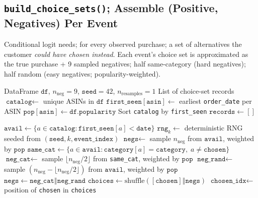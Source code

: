 \documentclass[11pt,a4paper]{article}
\begin{document}
\subsection{\texttt{build\_choice\_sets()}; Assemble (Positive, Negatives) Per Event}
\label{sec:build-choice-sets}

Conditional logit needs; for every observed purchase; a set of alternatives the customer \emph{could have chosen instead}.  Each event's choice set is approximated as the true purchase + 9 sampled negatives; half same-category (hard negatives); half random (easy negatives; popularity-weighted).

\begin{algorithm}[H]
\caption{\textsc{BuildChoiceSets}}\label{alg:build-choice-sets}
\begin{algorithmic}[1]
\Require DataFrame $\texttt{df}$, $n_{\text{neg}}=9$, $\texttt{seed}=42$, $n_{\text{resamples}}=1$
\Ensure List of choice-set records
\State $\texttt{catalog} \gets$ unique ASINs in $\texttt{df}$
\State $\texttt{first\_seen}[\texttt{asin}] \gets$ earliest \texttt{order\_date} per ASIN
\State $\texttt{pop}[\texttt{asin}] \gets \texttt{df.popularity}$ 
\State Sort \texttt{catalog} by \texttt{first\_seen}
\State $\texttt{records} \gets []$

    \State $\texttt{avail} \gets \{a \in \texttt{catalog} : \texttt{first\_seen}[a] < \texttt{date}\}$ 
        \State $\texttt{rng}_k \gets$ deterministic RNG seeded from $(\texttt{seed}, k, \texttt{event\_index})$
            \State $\texttt{negs} \gets$ sample $n_{\text{neg}}$ from $\texttt{avail}$, weighted by $\texttt{pop}$
        \Else
            \State $\texttt{same\_cat} \gets \{a \in \texttt{avail} : \texttt{category}[a] = \texttt{category},\; a \ne \texttt{chosen}\}$
            \State $\texttt{neg\_cat} \gets$ sample $\lfloor n_{\text{neg}}/2 \rfloor$ from \texttt{same\_cat}, weighted by $\texttt{pop}$
            \State $\texttt{neg\_rand} \gets$ sample $(n_{\text{neg}} - \lfloor n_{\text{neg}}/2 \rfloor)$ from $\texttt{avail}$, weighted by $\texttt{pop}$
            \State $\texttt{negs} \gets \texttt{neg\_cat} \mathbin\Vert \texttt{neg\_rand}$
        \EndIf
        \State $\texttt{choices} \gets \text{shuffle}([\texttt{chosen}] \mathbin\Vert \texttt{negs})$
        \State $\texttt{chosen\_idx} \gets$ position of \texttt{chosen} in \texttt{choices}
    \EndFor


\end{algorithmic}
\end{algorithm}
\end{document}
